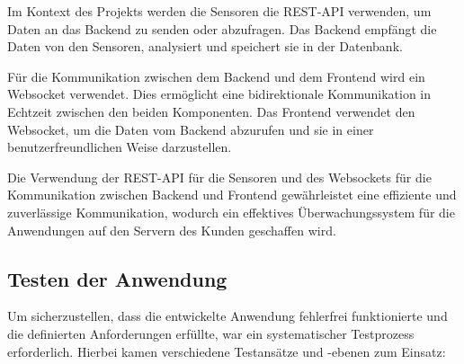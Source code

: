 \begin{flushleft}
	Im Kontext des Projekts werden die Sensoren die REST-API verwenden, um Daten an das Backend zu senden oder abzufragen. Das Backend empfängt die Daten von den Sensoren, analysiert und speichert sie in der Datenbank.

	Für die Kommunikation zwischen dem Backend und dem Frontend wird ein Websocket verwendet. Dies ermöglicht eine bidirektionale Kommunikation in Echtzeit zwischen den beiden Komponenten. Das Frontend verwendet den Websocket, um die Daten vom Backend abzurufen und sie in einer benutzerfreundlichen Weise darzustellen.

	Die Verwendung der REST-API für die Sensoren und des Websockets für die Kommunikation zwischen Backend und Frontend gewährleistet eine effiziente und zuverlässige Kommunikation, wodurch ein effektives Überwachungssystem für die Anwendungen auf den Servern
	des Kunden geschaffen wird.


	\subsection{Testen der Anwendung}
	Um sicherzustellen, dass die entwickelte Anwendung fehlerfrei funktionierte und die definierten Anforderungen erfüllte, war ein systematischer Testprozess erforderlich. Hierbei kamen verschiedene Testansätze und -ebenen zum Einsatz:


\end{flushleft}

